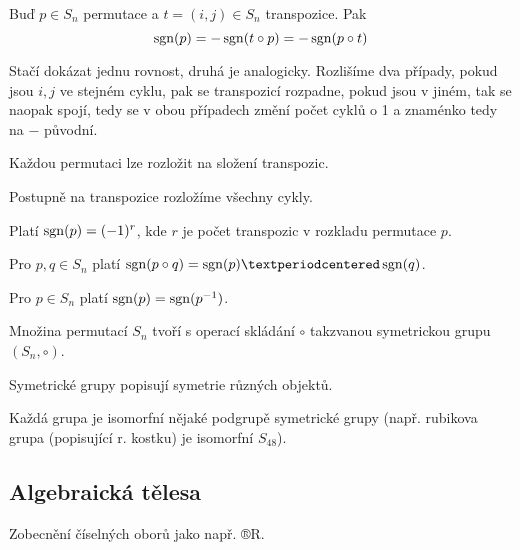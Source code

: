 \documentclass[12pt]{article}					%
\begin{document}
        \begin{veta}
            Buď $p \in S_n$ permutace a $t = (i, j) \in S_n$ transpozice. Pak
            $$ \operatorname{sgn}(p) = -\operatorname{sgn}(t\circ p) = -\operatorname{sgn}(p\circ t) $$
            \begin{dukazin}
                Stačí dokázat jednu rovnost, druhá je analogicky. Rozlišíme dva případy, pokud jsou $i, j$ ve stejném cyklu, pak se transpozicí rozpadne, pokud jsou v jiném, tak se naopak spojí, tedy se v obou případech změní počet cyklů o 1 a znaménko tedy na $-$ původní.
            \end{dukazin}
        \end{veta}

        \begin{veta}
            Každou permutaci lze rozložit na složení transpozic.
            \begin{dukazin}
                Postupně na transpozice rozložíme všechny cykly.
            \end{dukazin}
        \end{veta}

        \begin{dusledek}
            Platí $\operatorname{sgn}(p) = (-1)^r$, kde $r$ je počet transpozic v rozkladu permutace $p$.

            Pro $p, q \in S_n$ platí $\sgn(p \circ q) = \sgn(p)·\sgn(q)$.

            Pro $p \in S_n$ platí $\operatorname{sgn}(p) = \operatorname{sgn}(p^{-1})$.
        \end{dusledek}

        \begin{definice}
            Množina permutací $S_n$ tvoří s operací skládání $\circ$ takzvanou symetrickou grupu $(S_n, \circ)$.
        \end{definice}

        \begin{poznamka}
            Symetrické grupy popisují symetrie různých objektů.

            Každá grupa je isomorfní nějaké podgrupě symetrické grupy (např. rubikova grupa (popisující r. kostku) je isomorfní $S_{48}$).
        \end{poznamka}
    
    \subsection{Algebraická tělesa}
        Zobecnění číselných oborů jako např. ®R.
\end{document}
